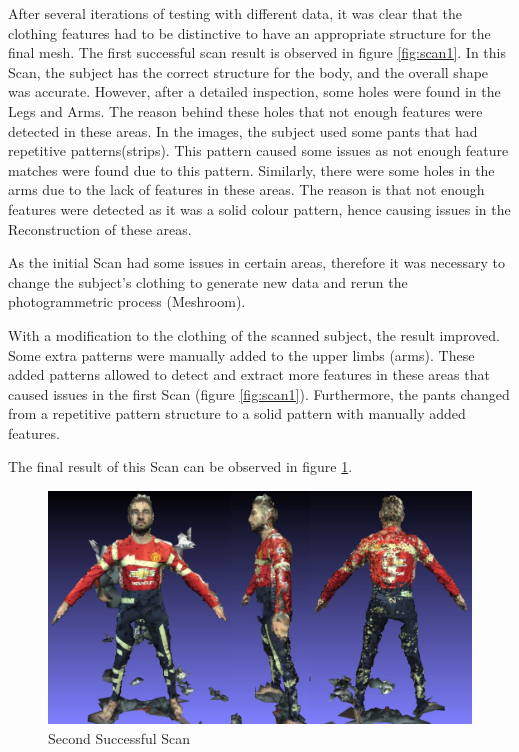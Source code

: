 \documentclass[12pt]{report}
\begin{document}
\newpage
After several iterations of testing with different data, it was clear that the clothing features had to be distinctive to have an appropriate structure for the final mesh.
The first successful scan result is observed in figure \ref{fig:scan1}.
In this Scan, the subject has the correct structure for the body, and the overall shape was accurate. However, after a detailed inspection, some holes were found in the Legs and Arms.
The reason behind these holes that not enough features were detected in these areas. In the images, the subject used some pants that had repetitive patterns(strips). 
This pattern caused some issues as not enough feature matches were found due to this pattern. 
Similarly, there were some holes in the arms due to the lack of features in these areas. The reason is that not enough features were detected as it was a solid colour pattern, hence causing issues in the Reconstruction of these areas. 

As the initial Scan had some issues in certain areas, therefore it was necessary to change the subject's clothing to generate new data and rerun the photogrammetric process (Meshroom). 

With a modification to the clothing of the scanned subject, the result improved.
Some extra patterns were manually added to the upper limbs (arms). These added patterns allowed to detect and extract more features in these areas that caused issues in the first Scan (figure \ref{fig:scan1}).
Furthermore, the pants changed from a repetitive pattern structure to a solid pattern with manually added features. 

The final result of this Scan can be observed in figure \ref{fig:scan2}.
\begin{figure}[H]%
  \centering
 \includegraphics[width=1\textwidth]{scan2.png}
\caption{Second Successful Scan}
\label{fig:scan2} 
\end{figure}
\end{document}

